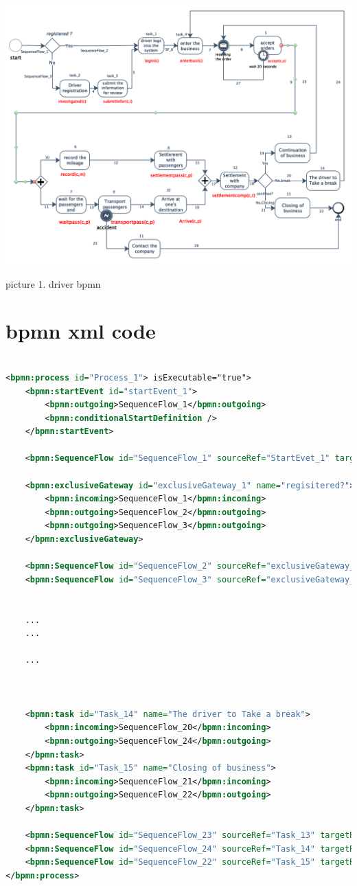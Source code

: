 \documentclass[runningheads]{llncs}
\begin{document}
\centerline{\includegraphics[scale=0.7]{driver_bpmn_128.png}}
\centerline{picture 1. driver bpmn}




\section{bpmn xml code}
\begin{lstlisting}[language={xml}]	%代码段语句

<bpmn:process id="Process_1"> isExecutable="true">
	<bpmn:startEvent id="startEvent_1">
		<bpmn:outgoing>SequenceFlow_1</bpmn:outgoing>
		<bpmn:conditionalStartDefinition />
	</bpmn:startEvent>

	<bpmn:SequenceFlow id="SequenceFlow_1" sourceRef="StartEvet_1" targetRef="exclusiveGateway_1">

	<bpmn:exclusiveGateway id="exclusiveGateway_1" name="regisitered?">
		<bpmn:incoming>SequenceFlow_1</bpmn:incoming>
		<bpmn:outgoing>SequenceFlow_2</bpmn:outgoing>
		<bpmn:outgoing>SequenceFlow_3</bpmn:outgoing>
	</bpmn:exclusiveGateway>

	<bpmn:SequenceFlow id="SequenceFlow_2" sourceRef="exclusiveGateway_1" targetRef="Task_1">
	<bpmn:SequenceFlow id="SequenceFlow_3" sourceRef="exclusiveGateway_1" targetRef="Task_2">


	...
	...

	...


	
	<bpmn:task id="Task_14" name="The driver to Take a break">
		<bpmn:incoming>SequenceFlow_20</bpmn:incoming>
		<bpmn:outgoing>SequenceFlow_24</bpmn:outgoing>
	</bpmn:task> 
	<bpmn:task id="Task_15" name="Closing of business">
		<bpmn:incoming>SequenceFlow_21</bpmn:incoming>
		<bpmn:outgoing>SequenceFlow_22</bpmn:outgoing>
	</bpmn:task> 

	<bpmn:SequenceFlow id="SequenceFlow_23" sourceRef="Task_13" targetRef="IntermediateCatchEvent_1" /> 
	<bpmn:SequenceFlow id="SequenceFlow_24" sourceRef="Task_14" targetRef="Task_4" /> 
	<bpmn:SequenceFlow id="SequenceFlow_22" sourceRef="Task_15" targetRef="endEvent_1" /> 
</bpmn:process>
	\end{lstlisting}
\end{document}
